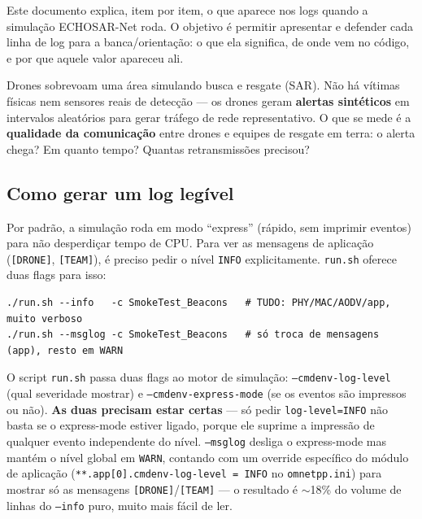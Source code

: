 \documentclass[11pt,a4paper]{article}
\begin{document}
Este documento explica, item por item, o que aparece nos logs quando a simulação
ECHOSAR-Net roda. O objetivo é permitir apresentar e defender cada linha de log
para a banca/orientação: o que ela significa, de onde vem no código, e por que
aquele valor apareceu ali.

\begin{explica}
Drones sobrevoam uma área simulando busca e resgate (SAR). Não há vítimas físicas
nem sensores reais de detecção --- os drones geram \textbf{alertas sintéticos}
em intervalos aleatórios para gerar tráfego de rede representativo. O que se mede
é a \textbf{qualidade da comunicação} entre drones e equipes de resgate em terra:
o alerta chega? Em quanto tempo? Quantas retransmissões precisou?
\end{explica}

\subsection{Como gerar um log legível}

Por padrão, a simulação roda em modo ``express'' (rápido, sem imprimir eventos)
para não desperdiçar tempo de CPU. Para ver as mensagens de aplicação
(\texttt{[DRONE]}, \texttt{[TEAM]}), é preciso pedir o nível \texttt{INFO}
explicitamente. \texttt{run.sh} oferece duas flags para isso:

\begin{lstlisting}[style=shellcmd]
./run.sh --info   -c SmokeTest_Beacons   # TUDO: PHY/MAC/AODV/app, muito verboso
./run.sh --msglog -c SmokeTest_Beacons   # só troca de mensagens (app), resto em WARN
\end{lstlisting}

\begin{explica}
O script \texttt{run.sh} passa duas flags ao motor de simulação:
\texttt{--cmdenv-log-level} (qual severidade mostrar) e
\texttt{--cmdenv-express-mode} (se os eventos são impressos ou não).
\textbf{As duas precisam estar certas} --- só pedir \texttt{log-level=INFO}
não basta se o express-mode estiver ligado, porque ele suprime a impressão
de qualquer evento independente do nível. \texttt{--msglog} desliga o
express-mode mas mantém o nível global em \texttt{WARN}, contando com um
override específico do módulo de aplicação (\texttt{**.app[0].cmdenv-log-level
= INFO} no \texttt{omnetpp.ini}) para mostrar só as mensagens
\texttt{[DRONE]}/\texttt{[TEAM]} --- o resultado é $\sim$18\% do volume de
linhas do \texttt{--info} puro, muito mais fácil de ler.
\end{explica}
\end{document}
